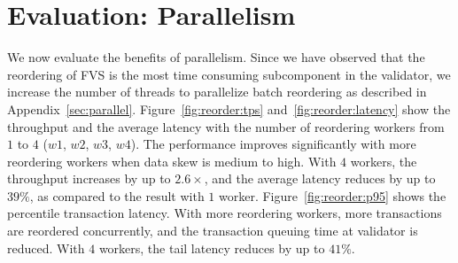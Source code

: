 
\section{Evaluation: Parallelism}
\label{sec:experiments:parallel}


We now evaluate the benefits of parallelism. Since we have observed that the reordering of FVS is the most time consuming subcomponent in the validator, we increase the number of threads to parallelize batch reordering as described in Appendix~\ref{sec:parallel}. 
Figure~\ref{fig:reorder:tps} and~\ref{fig:reorder:latency} show the throughput
and the average latency with the number of reordering workers from $1$ to $4$
($w1$, $w2$, $w3$, $w4$). The performance improves significantly with more reordering workers when data skew is medium to high. With $4$ workers, the throughput increases by up to $2.6\times$, and the average latency reduces by up to $39\%$, as compared to the result with $1$ worker. Figure~\ref{fig:reorder:p95} shows the percentile transaction latency. With more reordering workers, more transactions are reordered concurrently, and the transaction queuing time at validator is reduced. With $4$ workers, the tail latency reduces by up to $41\%$.


